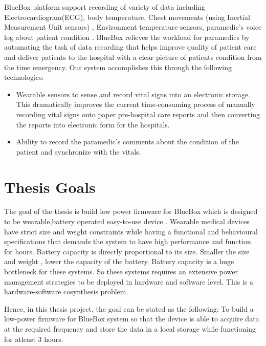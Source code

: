 BlueBox  platform support recording of variety of data including Electrocardiogram(ECG), body temperature, Chest movements (using Inertial Measurement Unit sensors) , Environment temperature sensors, paramedic’s voice log about patient condition . BlueBox relieves the workload for paramedics by automating the task of data recording that helps improve quality of patient care and deliver patients to the hospital with a clear picture of patients condition from the time emergency. Our system accomplishes this through the following technologies:

\begin{itemize}
	\item Wearable sensors to sense and record vital signs into an electronic storage. This dramatically improves the current time-consuming process of manually recording vital signs onto paper pre-hospital care reports and then converting the reports into electronic form for the hospitals.


	\item Ability to record the paramedic’s comments about the condition of the patient and synchronize with the vitals.
	
\end{itemize}

\section{Thesis Goals}
The goal of the thesis is build low power firmware for BlueBox which is designed to be wearable,battery operated easy-to-use device . Wearable medical devices have strict size and weight constraints while having a functional and behavioural specifications that demands the system to have high performance and function for hours. Battery capacity is directly proportional to its size. Smaller the size and weight , lower the capacity of the battery\cite{}. Battery capacity is a huge bottleneck for these systems. So these systems requires an extensive power management strategies to be deployed in hardware and software level. This is a hardware-software cosynthesis problem.

Hence, in this thesis project, the goal can be stated as the following:
 To build a low-power firmware for BlueBox system so that the device is able to acquire data at the required frequency and store the data in a local storage while functioning for atleast 3 hours. 
 
